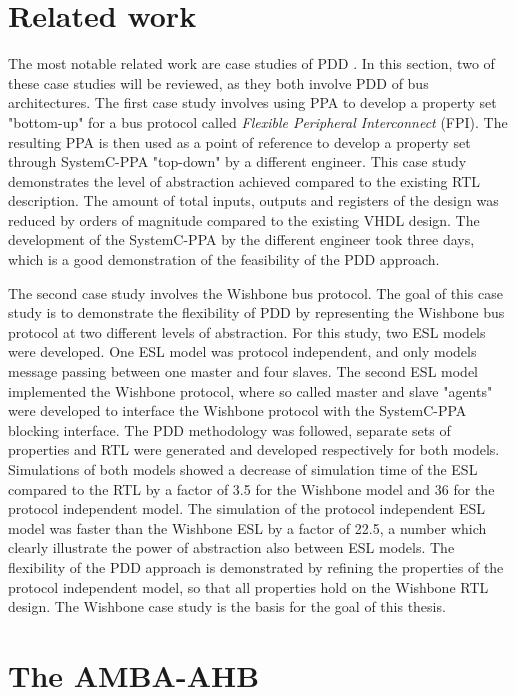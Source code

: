 \section{Related work}
\label{sec:related}
The most notable related work are case studies of PDD \cite{pddref}. In this section, two of these case studies will be reviewed, as they both involve PDD of bus architectures.
The first case study involves using PPA to develop a property set "bottom-up" for a bus protocol called \textit{Flexible Peripheral Interconnect} (FPI). The resulting PPA is then used as a point of reference to develop a property set through SystemC-PPA "top-down" by a different engineer. This case study demonstrates the level of abstraction achieved compared to the existing RTL description. The amount of total inputs, outputs and registers of the design was reduced by orders of magnitude compared to the existing VHDL design. The development of the SystemC-PPA by the different engineer took three days, which is a good demonstration of the feasibility of the PDD approach. \par
The second case study involves the Wishbone bus protocol. The goal of this case study is to demonstrate the flexibility of PDD by representing the Wishbone bus protocol at two different levels of abstraction. For this study, two ESL models were developed. One ESL model was protocol independent, and only models message passing between one master and four slaves. The second ESL model implemented the Wishbone protocol, where so called master and slave "agents" were developed to interface the Wishbone protocol with the SystemC-PPA blocking interface. The PDD methodology was followed, separate sets of properties and RTL were generated and developed respectively for both models. Simulations of both models showed a decrease of simulation time of the ESL compared to the RTL by a factor of 3.5 for the Wishbone model and 36 for the protocol independent model. The simulation of the protocol independent ESL model was faster than the Wishbone ESL by a factor of 22.5, a number which clearly illustrate the power of abstraction also between ESL models. The flexibility of the PDD approach is demonstrated by refining the properties of the protocol independent model, so that all properties hold on the Wishbone RTL design. The Wishbone case study is the basis for the goal of this thesis. 


\section{The AMBA-AHB}
\label{sec:ahb}

